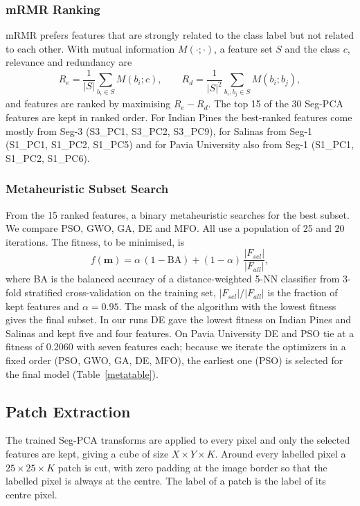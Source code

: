 \documentclass[conference]{IEEEtran}
\begin{document}
	\subsubsection{mRMR Ranking}
	mRMR\cite{mrmr} prefers features that are strongly related to the class label but not related to each other. With mutual information $M(\cdot;\cdot)$, a feature set $S$ and the class $c$, relevance and redundancy are
	\begin{equation}
		R_e=\frac{1}{|S|}\sum_{b_i\in S}M(b_i;c),\qquad
		R_d=\frac{1}{|S|^2}\sum_{b_i,b_j\in S}M(b_i;b_j),
	\end{equation}
	and features are ranked by maximising $R_e-R_d$. The top 15 of the 30 Seg-PCA features are kept in ranked order. For Indian Pines the best-ranked features come mostly from Seg-3 (S3\_PC1, S3\_PC2, S3\_PC9), for Salinas from Seg-1 (S1\_PC1, S1\_PC2, S1\_PC5) and for Pavia University also from Seg-1 (S1\_PC1, S1\_PC2, S1\_PC6).
	
	\subsubsection{Metaheuristic Subset Search}
	From the 15 ranked features, a binary metaheuristic searches for the best subset. We compare PSO, GWO, GA, DE and MFO. All use a population of 25 and 20 iterations. The fitness, to be minimised, is
	\begin{equation}
		f(\mathbf{m})=\alpha\,(1-\mathrm{BA})+(1-\alpha)\,\frac{|F_{sel}|}{|F_{all}|},
	\end{equation}
	where BA is the balanced accuracy of a distance-weighted 5-NN classifier from 3-fold stratified cross-validation on the training set, $|F_{sel}|/|F_{all}|$ is the fraction of kept features and $\alpha=0.95$. The mask of the algorithm with the lowest fitness gives the final subset. In our runs DE gave the lowest fitness on Indian Pines and Salinas and kept five and four features. On Pavia University DE and PSO tie at a fitness of 0.2060 with seven 
	features each; because we iterate the optimizers in a fixed order 
	(PSO, GWO, GA, DE, MFO), the earliest one (PSO) is selected for the 
	final model (Table~\ref{metatable}).
	
	\subsection{Patch Extraction}
	The trained Seg-PCA transforms are applied to every pixel and only the selected features are kept, giving a cube of size $X\times Y\times K$. Around every labelled pixel a $25\times25\times K$ patch is cut, with zero padding at the image border so that the labelled pixel is always at the centre. The label of a patch is the label of its centre pixel.
	
\end{document}
